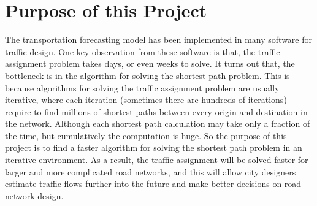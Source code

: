 \begin{comment}
Both of these methods are iterative methods that require shortest path calculations for every trip origins in the network.
It is not difficult to imagine that there would be many shortest path calculations if the network has hundreds of origins and destinations and takes some iterations to solve.
Each shortest path calculation would also be very hard to solve if the network has a few hundred intersections and a few thousand roads for a realistic city road network.
\citet{Sheffi} states that finding the shortest path is the most computation intensive component for the PE or Frank-Wolfe algorithms, 
other components in the algorithms such as updating new values and convergence check only requires a few percentages of the total running time.
Overall, speeding up shortest path calculations would significantly speed up the traffic assignment algorithms.
As a result,
traffic forecasting would be solved faster for larger and more complicated road networks,
which allow city designers predict traffic further into the future and make better decisions on road network design.
\end{comment}

\section{Purpose of this Project}
The transportation forecasting model has been implemented in many software for traffic design.
One key observation from these software is that,
the traffic assignment problem takes days, or even weeks to solve.
It turns out that,
the bottleneck is in the algorithm for solving the shortest path problem.
This is because algorithms for solving the traffic assignment problem are usually iterative,
where each iteration (sometimes there are hundreds of iterations) require to find millions of shortest paths between every origin and destination in the network.
Although each shortest path calculation may take only a fraction of the time,
but cumulatively the computation is huge.
So the purpose of this project is to find a faster algorithm for solving the shortest path problem in an iterative environment.
As a result, the traffic assignment will be solved faster
for larger and more complicated road networks,
and this will allow city designers estimate traffic flows further into the future and make better decisions on road network design.

